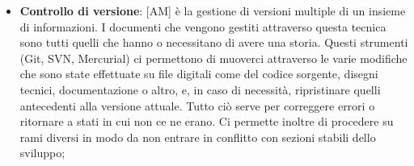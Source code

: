 \begin{itemize}
		\item \textbf{Controllo di versione}: [AM]  è la gestione di versioni multiple di un insieme di informazioni. I documenti che vengono gestiti attraverso questa tecnica sono tutti quelli che hanno o necessitano di avere una storia.\newline
	Questi strumenti (Git, SVN, Mercurial) ci permettono di muoverci attraverso le varie modifiche che sono state effettuate su file digitali come del codice sorgente, disegni tecnici, documentazione o altro, e, in caso di necessità, ripristinare quelli antecedenti alla versione attuale. \newline
	Tutto ciò serve per correggere errori o ritornare a stati in cui non ce ne erano. Ci permette inoltre di procedere su rami diversi in modo da non entrare in conflitto con sezioni stabili dello sviluppo;

	\end{itemize}